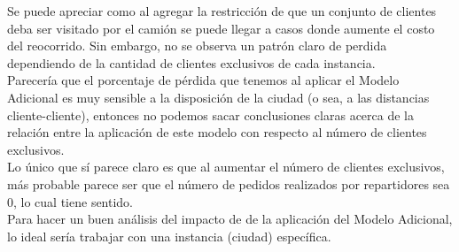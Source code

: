 \documentclass{article}
\begin{document}
    \begin{table}[H]
    \centering
    \caption{Comparación de costos entre Nuevo Modelo y Modelo Adicional para diferentes cantidades de clientes exclusivos}
    \end{table}
    Se puede apreciar como al agregar la restricción de que un conjunto de clientes deba ser visitado por el camión se puede llegar a casos donde aumente el costo del reocorrido.
    Sin embargo, no se observa un patrón claro de perdida dependiendo de la cantidad de clientes exclusivos de cada instancia.\\
    Parecería que el porcentaje de pérdida que tenemos al aplicar el Modelo Adicional es muy sensible a la disposición de la ciudad (o sea, a las distancias cliente-cliente), entonces no podemos sacar conclusiones claras acerca de la relación entre la aplicación de este modelo con respecto al número de clientes exclusivos. \\
    Lo único que sí parece claro es que al aumentar el número de clientes exclusivos, más probable parece ser que el número de pedidos realizados por repartidores sea 0, lo cual tiene sentido. \\
    Para hacer un buen análisis del impacto de de la aplicación del Modelo Adicional, lo ideal sería trabajar con una instancia (ciudad) específica.
\end{document}
